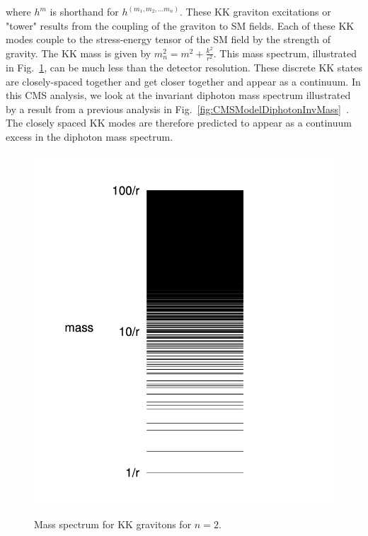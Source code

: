 where $h^{m}$ is shorthand for $h^{(m_1,m_2,...m_n)}$. 
These KK graviton excitations or "tower" results from the coupling of the graviton to SM fields. Each of these KK modes couple to the stress-energy tensor of the SM field by the strength of gravity. The KK mass is given by $m^2_n = m^2 + \frac{k^2}{r^2}$. This mass spectrum, illustrated in Fig.~\ref{fig:KKmassSpectrum}, can be much less than the detector resolution. These discrete KK states are closely-spaced together and get closer together and appear as a continuum. In this CMS analysis, we look at the invariant diphoton mass spectrum illustrated by a result from a previous analysis in Fig.~\ref{fig:CMSModelDiphotonInvMass}~\cite{CMS:2011uvc}. The closely spaced KK modes are therefore predicted to appear as a continuum excess in the diphoton mass spectrum. 

\begin{figure}[!htbp]
    \centering
    \caption{Mass spectrum for KK gravitons for $n=2$.}
    \includegraphics[scale=0.4]{fig/KKMassSpectrum.png}
    \label{fig:KKmassSpectrum}
\end{figure}


